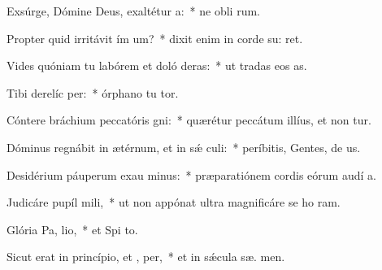 \item Exsúrge, Dómine Deus, exaltétur  a:~* ne obli rum.
\item Propter quid irritávit ím um?~* dixit enim in corde su:  ret.
\item Vides quóniam tu labórem et doló deras:~* ut tradas eos   as.
\item Tibi derelíc  per:~* órphano tu  tor.
\item Cóntere bráchium peccatóris  gni:~* quærétur peccátum illíus, et non tur.
\item Dóminus regnábit in ætérnum, et in sǽ culi:~* períbitis, Gentes, de  us.
\item Desidérium páuperum exau minus:~* præparatiónem cordis eórum audí  a.
\item Judicáre pupíl  mili,~* ut non appónat ultra magnificáre se ho  ram.
\item Glória Pa,  lio,~* et Spi to.
\item Sicut erat in princípio, et ,  per,~* et in sǽcula sæ. men.
